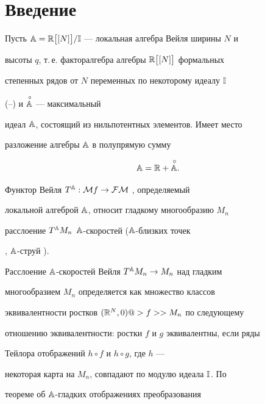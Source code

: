 \label{begin}








\section{Введение}





Пусть ${\Bbb A}={\Bbb R}\big[[N]\big]/{\Bbb I}$ --- локальная алгебра Вейля ширины $N$ и


высоты $q$, т.\,е.  факторалгебра алгебры ${\Bbb R}\big[[N]\big]$ формальных


степенных рядов от $N$ переменных по некоторому идеалу ${\Bbb I}$


(\cite{Weil}--\cite{VSh1}) и $\overset{\,\circ}{{\Bbb A}}{}$ --- максимальный


идеал ${\Bbb A}$, состоящий из нильпотентных элементов. Имеет место


разложение алгебры ${\Bbb A}$  в полупрямую сумму


\begin{equation}


\A=\R+\rad{\A}. \label{1}


\end{equation}





Функтор  Вейля $T^{\Bbb A}:{\cal M} f\rightarrow{\cal{FM}}$ \cite{Weil}, определяемый


локальной алгеброй ${\Bbb A}$, относит гладкому многообразию $M_n$


расслоение $T^{\Bbb A} M_n$ ${\Bbb A}$-скоростей \cite{KMS} (${\Bbb A}$-близких точек


\cite{Weil}, ${\Bbb A}$-струй \cite{VSh2}).





Расслоение ${\Bbb A}$-скоростей Вейля $T^{\Bbb A} M_n\rightarrow M_n$ над гладким


многообразием $M_n$ определяется как множество классов


эквивалентности ростков $({\Bbb R}^N,0)@>{f}>>M_n$ по следующему


отношению эквивалентности: ростки $f$ и  $g$ эквивалентны, если ряды


Тейлора отображений $h\circ {f}$ и $h\circ {g}$, где $h$ ---


некоторая карта на $M_n$, совпадают по модулю идеала ${\Bbb I}$. По


теореме об ${\Bbb A}$-гладких отображениях \cite{VSh1} преобразования


